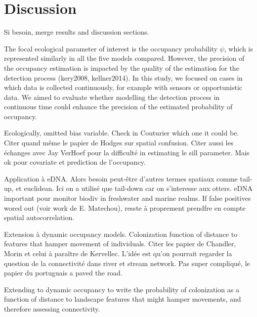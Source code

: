 \documentclass[
  11pt,
  a4paper,
]{article}
\begin{document}
\section{Discussion}\label{discussion}

Si besoin, merge results and discussion sections.

The focal ecological parameter of interest is the occupancy probability \(\psi\), which is represented similarly in all the five models compared. However, the precision of the occupancy estimation is impacted by the quality of the estimation for the detection process (kery2008, kellner2014). In this study, we focused on cases in which data is collected continuously, for example with sensors or opportunistic data. We aimed to evaluate whether modelling the detection process in continuous time could enhance the precision of the estimated probability of occupancy.

Ecologically, omitted bias variable. Check in Couturier which one it could be. Citer quand même le papier de Hodges sur spatial confusion. Citer aussi les échanges avec Jay VerHoef pour la difficulté in estimating le sill parameter. Mais ok pour covariate et prediction de l'occupancy.

Application à eDNA. Alors besoin peut-être d'autres termes spatiaux comme tail-up, et euclidean. Ici on a utilisé que tail-down car on s'interesse aux otters. eDNA important pour monitor biodiv in freshwater and marine realms. If false positives wored out (voir work de E. Matechou), resste à proprement prendfre en compte spatial autocorrelation.

Extension à dynamic occupancy models. Colonization function of distance to features that hamper movement of individuals. Citer les papier de Chandler, Morin et celui à paraître de Kervellec. L'idée est qu'on pourrait regarder la question de la connectivité dans river et stream network. Pas super compliqué, le papier du portuguais a paved the road.

Extending to dynamic occupancy to write the probability of colonization as a function of distance to landscape features that might hamper movements, and therefore assessing connectivity.
\end{document}

